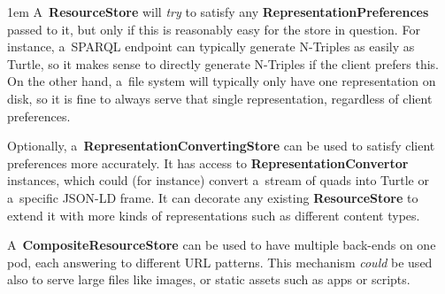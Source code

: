 \documentclass[10pt]{article}
\newcommand\component[1]{\mbox{\bf #1}}
\newenvironment{Note}
  {\begin{multicols}{3}%
     \parskip 1em}
  {\end{multicols}}
\begin{document}

\bigskip

\begin{Note}
A~\component{ResourceStore} will \emph{try} to satisfy
any \component{RepresentationPreferences} passed to it,
but only if this is reasonably easy for the store in question.
For instance, a~SPARQL endpoint can typically
generate N-Triples as easily as Turtle,
so it makes sense to directly generate N-Triples
if the client prefers this.
On the other hand,
a~file system will typically only have one representation on disk,
so it is fine to always serve that single representation,
regardless of client preferences.
\columnbreak

Optionally, a~\component{RepresentationConvertingStore} can be used
to satisfy client preferences more accurately.
It has access to \component{RepresentationConvertor} instances,
which could (for instance) convert a~stream of quads
into Turtle or a~specific JSON-LD frame.
It can decorate any existing \component{ResourceStore}
to extend it with more kinds of representations
such as different content types.
\columnbreak

A~\component{CompositeResourceStore} can be used
to have multiple back-ends on one pod,
each answering to different URL patterns.
This mechanism \emph{could} be used
also to serve large files like images,
or static assets such as apps or scripts.
\end{Note}
\end{document}
